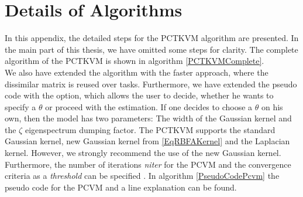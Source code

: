 \chapter{Details of Algorithms}\label{appac}
In this appendix, the detailed steps for the \acs{PCTKVM} algorithm are presented.
In the main part of this thesis, we have omitted some steps for clarity.
The complete algorithm of the \acs{PCTKVM} is shown in algorithm \ref{PCTKVMComplete}.\\
We also have extended the algorithm with the faster approach, where the dissimilar matrix is reused over tasks.
Furthermore, we have extended the pseudo code with the option, which allows the user to decide, whether he wants to specify a $\theta$ or proceed with the estimation.
If one decides to choose a $\theta$ on his own, then the model has two parameters: The width of the Gaussian kernel and the $\zeta$ eigenspectrum dumping factor.
The \acs{PCTKVM} supports the standard Gaussian kernel, new Gaussian kernel from \eqref{EqRBFAKernel} and the Laplacian kernel.
However, we strongly recommend the use of the new Gaussian kernel.\\
Furthermore, the number of iterations \textit{niter} for the \acs{PCVM} and the convergence criteria as a \textit{threshold}  can be specified .
In algorithm \ref{PseudoCodePcvm} the pseudo code for the \acs{PCVM} and a line explanation can be found.

